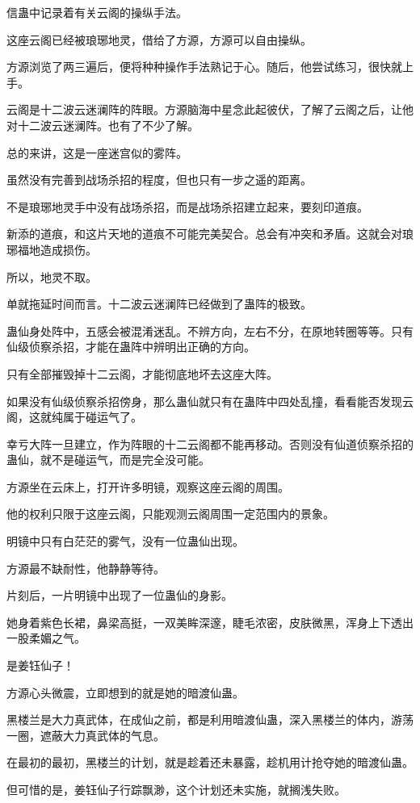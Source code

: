 \begin{this_body}
信蛊中记录着有关云阁的操纵手法。

这座云阁已经被琅琊地灵，借给了方源，方源可以自由操纵。

方源浏览了两三遍后，便将种种操作手法熟记于心。随后，他尝试练习，很快就上手。

云阁是十二波云迷澜阵的阵眼。方源脑海中星念此起彼伏，了解了云阁之后，让他对十二波云迷澜阵。也有了不少了解。

总的来讲，这是一座迷宫似的雾阵。

虽然没有完善到战场杀招的程度，但也只有一步之遥的距离。

不是琅琊地灵手中没有战场杀招，而是战场杀招建立起来，要刻印道痕。

新添的道痕，和这片天地的道痕不可能完美契合。总会有冲突和矛盾。这就会对琅琊福地造成损伤。

所以，地灵不取。

单就拖延时间而言。十二波云迷澜阵已经做到了蛊阵的极致。

蛊仙身处阵中，五感会被混淆迷乱。不辨方向，左右不分，在原地转圈等等。只有仙级侦察杀招，才能在蛊阵中辨明出正确的方向。

只有全部摧毁掉十二云阁，才能彻底地坏去这座大阵。

如果没有仙级侦察杀招傍身，那么蛊仙就只有在蛊阵中四处乱撞，看看能否发现云阁，这就纯属于碰运气了。

幸亏大阵一旦建立，作为阵眼的十二云阁都不能再移动。否则没有仙道侦察杀招的蛊仙，就不是碰运气，而是完全没可能。

方源坐在云床上，打开许多明镜，观察这座云阁的周围。

他的权利只限于这座云阁，只能观测云阁周围一定范围内的景象。

明镜中只有白茫茫的雾气，没有一位蛊仙出现。

方源最不缺耐性，他静静等待。

片刻后，一片明镜中出现了一位蛊仙的身影。

她身着紫色长裙，鼻梁高挺，一双美眸深邃，睫毛浓密，皮肤微黑，浑身上下透出一股柔媚之气。

是姜钰仙子！

方源心头微震，立即想到的就是她的暗渡仙蛊。

黑楼兰是大力真武体，在成仙之前，都是利用暗渡仙蛊，深入黑楼兰的体内，游荡一圈，遮蔽大力真武体的气息。

在最初的最初，黑楼兰的计划，就是趁着还未暴露，趁机用计抢夺她的暗渡仙蛊。

但可惜的是，姜钰仙子行踪飘渺，这个计划还未实施，就搁浅失败。


\end{this_body}
